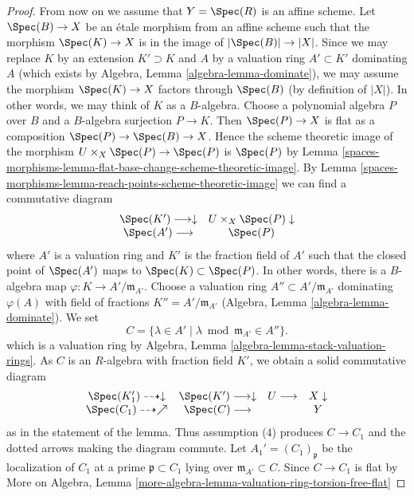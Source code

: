 \begin{proof}
\medskip\noindent
From now on we assume that $Y = \Spec(R)$ is an affine scheme.
Let $\Spec(B) \to X$ be an \'etale morphism from an affine scheme
such that the morphism $\Spec(K) \to X$ is in the image of
$|\Spec(B)| \to |X|$. Since we may replace $K$ by an extension
$K' \supset K$ and $A$ by a valuation ring $A' \subset K'$
dominating $A$ (which exists by
Algebra, Lemma \ref{algebra-lemma-dominate}),
we may assume the morphism $\Spec(K) \to X$ factors through $\Spec(B)$
(by definition of $|X|$). In other words, we may think of $K$ as a $B$-algebra.
Choose a polynomial algebra $P$ over $B$ and a $B$-algebra surjection
$P \to K$. Then $\Spec(P) \to X$ is flat as a composition
$\Spec(P) \to \Spec(B) \to X$. Hence the scheme theoretic image
of the morphism $U \times_X \Spec(P) \to \Spec(P)$ is $\Spec(P)$ by
Lemma \ref{spaces-morphisms-lemma-flat-base-change-scheme-theoretic-image}.
By Lemma \ref{spaces-morphisms-lemma-reach-points-scheme-theoretic-image}
we can find a commutative diagram
$$
\begin{array}{cc}\Spec(K') \longrightarrow\downarrow & U \times_X \Spec(P) \downarrow \\ \Spec(A') \longrightarrow & \Spec(P)\end{array}
$$
where $A'$ is a valuation ring and $K'$ is the fraction field of $A'$
such that the closed point of $\Spec(A')$ maps to
$\Spec(K) \subset \Spec(P)$. In other words, there is a $B$-algebra map
$\varphi : K \to A'/\mathfrak m_{A'}$. Choose a valuation ring
$A'' \subset A'/\mathfrak m_{A'}$ dominating $\varphi(A)$ with
field of fractions $K'' = A'/\mathfrak m_{A'}$
(Algebra, Lemma \ref{algebra-lemma-dominate}). We set
$$
C = \{\lambda \in A' \mid \lambda \bmod \mathfrak m_{A'} \in A''\}.
$$
which is a valuation ring by
Algebra, Lemma \ref{algebra-lemma-stack-valuation-rings}.
As $C$ is an $R$-algebra with fraction field $K'$, we obtain a solid
commutative diagram
$$
\begin{array}{cccc}\Spec(K'_1) \dashrightarrow\downarrow & \Spec(K') \longrightarrow\downarrow & U \longrightarrow & X \downarrow \\ \Spec(C_1) \dashrightarrow\nearrow & \Spec(C) \longrightarrow &  & Y\end{array}
$$
as in the statement of the lemma. Thus assumption (4) produces
$C \to C_1$ and the dotted arrows making the diagram commute.
Let $A_1' = (C_1)_\mathfrak p$ be the localization of $C_1$
at a prime $\mathfrak p \subset C_1$ lying over
$\mathfrak m_{A'} \subset C$. Since $C \to C_1$ is flat by
More on Algebra, Lemma
\ref{more-algebra-lemma-valuation-ring-torsion-free-flat}

\end{proof}
